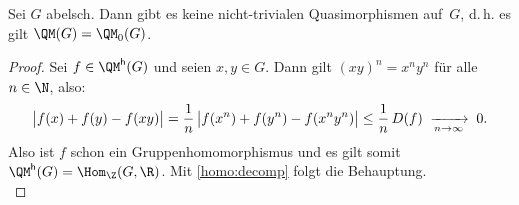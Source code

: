 \begin{thKorollar}
    Sei $G$ abelsch. Dann gibt es keine nicht-trivialen
    Quasimorphismen auf~$G$, d.\,h. es gilt $\QM(G) = \QM_0(G)$.
\end{thKorollar}

\begin{proof}
    Sei $f\in\QM\homo(G)$ und seien $x,y\in G$. Dann gilt
    $(xy)^n = x^ny^n$ für alle $n\in\N$, also:
    \[  \abs[\big]{ f(x) + f(y) - f(xy) }
        = \frac{1}{n} \, \abs[\big]{ f(x^n) + f(y^n) - f(x^ny^n) }
        \leq \frac{1}{n} \, D(f)
        \;\xrightarrow[n\to\infty]{}\; 0
    . \]
    Also ist $f$ schon ein Gruppenhomomorphismus und es gilt somit
    $\QM\homo(G) = \Hom_\Z(G,\R)$. Mit \cref{homo:decomp} folgt
    die Behauptung.
    \\
\end{proof}
